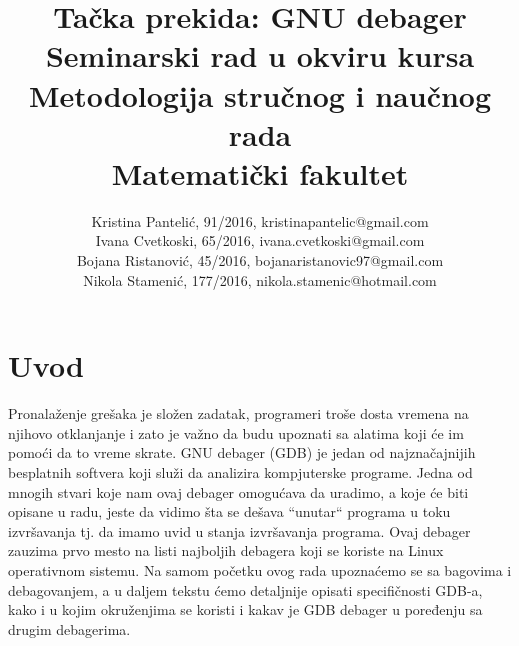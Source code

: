 \documentclass[a4paper]{article}
\begin{document}
\title{Tačka prekida: GNU debager\\ \small{Seminarski rad u okviru kursa\\Metodologija stručnog i naučnog rada\\ Matematički fakultet}}

\author{Kristina Pantelić, 91/2016, kristinapantelic@gmail.com 
\\
Ivana Cvetkoski, 65/2016, ivana.cvetkoski@gmail.com
\\
Bojana Ristanović, 45/2016, bojanaristanovic97@gmail.com
\\
Nikola Stamenić, 177/2016, nikola.stamenic@hotmail.com
}

\maketitle


\tableofcontents

\newpage

\section{Uvod}
\label{sec:uvod}

Pronalaženje grešaka je složen zadatak, programeri troše dosta vremena na njihovo otklanjanje i zato je važno da budu upoznati sa alatima 
koji će im pomoći da to vreme skrate. GNU debager (GDB) je jedan od najznačajnijih besplatnih softvera koji služi da analizira kompjuterske programe. Jedna od mnogih stvari koje nam ovaj debager omogućava da uradimo, a koje će biti opisane u radu, jeste da vidimo šta se dešava ``unutar`` programa u toku izvršavanja tj. da imamo uvid u stanja izvršavanja programa. Ovaj debager zauzima prvo mesto na listi 
najboljih debagera koji se koriste na Linux operativnom sistemu\cite{ubuntupit}. Na samom početku ovog rada upoznaćemo se sa bagovima i 
debagovanjem, a u daljem tekstu ćemo detaljnije opisati specifičnosti GDB-a, kako i u kojim okruženjima se koristi i kakav je GDB 
debager u poređenju sa drugim debagerima.   
\end{document}
